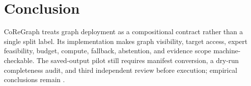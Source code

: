 \section{Conclusion}

CoReGraph treats graph deployment as a compositional contract rather than a
single split label. Its implementation makes graph visibility, target access,
expert feasibility, budget, compute, fallback, abstention, and evidence scope
machine-checkable. The saved-output pilot still requires manifest conversion,
a dry-run completeness audit, and third independent review before execution;
empirical conclusions remain \pending.
